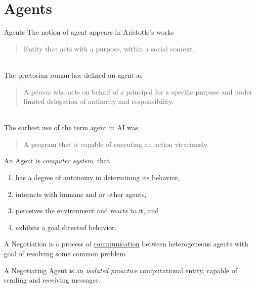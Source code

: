 \section{Agents}

\begin{frame}{Agents}
  The notion of agent appears in Aristotle's works
   \begin{quote}
     Entity that acts with a purpose, within a social context.
   \end{quote}\\\medskip
  The prætorian roman law defined an agent as
    \begin{quote}
      A person who acts on behalf of a principal for
      a specific purpose and under limited delegation of authority and
      responsibility.
    \end{quote}\\\medskip
  The earliest use of the term agent in AI was
    \begin{quote}
      A program that is capable of executing an action vicariously.
    \end{quote}
\end{frame}


\begin{frame}
  \centering
  \begin{block}{An Agent}
    is \emph{computer system}, that
    \begin{enumerate}
      \item has a degree of autonomy in determining its behavior,
      \item interacts with humans and or other agents,
      \item perceives the environment and reacts to it, and
      \item exhibits a goal directed behavior.
    \end{enumerate}
  \end{block}
  \begin{block}{A Negotiation}
     is a process of \underline{communication} between heterogeneous agents
     with goal of resolving some common problem.
  \end{block}
  \begin{block}{A Negotiating Agent}
     is an \emph{isolated} \emph{proactive} computational entity,
     capable of sending and receiving messages.
  \end{block}
\end{frame}

